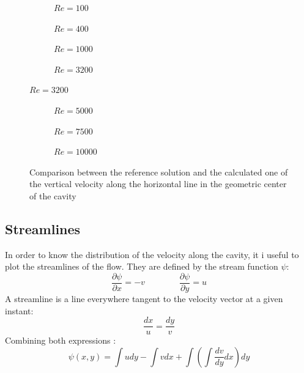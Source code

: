 \begin{figure}[h]
	\centering
	\begin{subfigure}{0.5\textwidth}
		\resizebox{1.4\textwidth}{!}{}
		\caption{$Re=100$}
	\end{subfigure}%
	\begin{subfigure}{0.5\textwidth}
		\resizebox{1.4\textwidth}{!}{}
		\caption{$Re=400$}
	\end{subfigure}
	\begin{subfigure}{0.5\textwidth}
		\resizebox{1.4\textwidth}{!}{}
		\caption{$Re=1000$}
	\end{subfigure}%
	\begin{subfigure}{0.5\textwidth}
		\resizebox{1.4\textwidth}{!}{}
		\caption{$Re=3200$}
	\end{subfigure}
\end{figure}
\begin{figure}\ContinuedFloat
	\begin{subfigure}{0.5\textwidth}
		\resizebox{1.4\textwidth}{!}{}
		\caption{$Re=5000$}
	\end{subfigure}%
	\begin{subfigure}{0.5\textwidth}
		\resizebox{1.4\textwidth}{!}{}
		\caption{$Re=7500$}
	\end{subfigure}
	\begin{subfigure}{0.5\textwidth}
		\center
		\resizebox{1.4\textwidth}{!}{}
		\caption{$Re=10000$}
	\end{subfigure}
	\caption[Comparison between the reference solution and the calculated one of the vertical velocity along the horizontal line in the geometric center of the cavity]{Comparison between the reference solution and the calculated one of the vertical velocity along the horizontal line in the geometric center of the cavity \cite{Ghia1982}}
	\label{Drivenvertical}
\end{figure}


\subsection{Streamlines}
In order to know the distribution of the velocity along the cavity, it i useful to plot the streamlines of the flow. They are defined by the stream function $\psi$:
\begin{equation}
\frac{\partial\psi}{\partial x}=-v
\qquad\qquad
\frac{\partial\psi}{\partial y}=u
\end{equation}
A streamline is a line everywhere tangent to the velocity vector at a given instant:
\begin{equation}
\frac{dx}{u}=\frac{dy}{v}
\end{equation}
Combining both expressions \cite{Haegland2007}:
\begin{equation}
\psi\left(x, y\right)=\int udy-\int vdx+\int\left(\int\frac{dv}{dy}dx\right)dy
\end{equation}